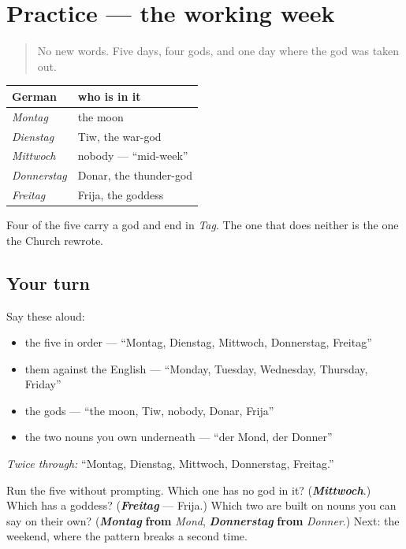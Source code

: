 \section[Practice]{Practice — the working week}

\label{lesson:GE-C07-wochentage-1}



\begin{quote}
No new words. Five days, four gods, and one day where the god was taken out.
\end{quote}

\begin{grammarlens}[title={Grammar Lens: the five, assembled}]
\noindent
\begin{tabularx}{\linewidth}{@{}>{\raggedright\arraybackslash}X>{\raggedright\arraybackslash}X@{}}
\toprule
\textbf{German} & \textbf{who is in it} \\
\midrule
\emph{Montag} & the moon \\
\emph{Dienstag} & Tiw, the war-god \\
\emph{Mittwoch} & nobody — \textquotedblleft{}mid-week\textquotedblright{} \\
\emph{Donnerstag} & Donar, the thunder-god \\
\emph{Freitag} & Frija, the goddess \\
\bottomrule
\end{tabularx}

Four of the five carry a god and end in \emph{Tag}. The one that does neither is the one the Church rewrote.
\end{grammarlens}

\subsection*{Your turn}
Say these aloud:

\begin{itemize}
\raggedright
  \item the five in order — \textquotedblleft{}Montag, Dienstag, Mittwoch, Donnerstag, Freitag\textquotedblright{}
  \item them against the English — \textquotedblleft{}Monday, Tuesday, Wednesday, Thursday, Friday\textquotedblright{}
  \item the gods — \textquotedblleft{}the moon, Tiw, nobody, Donar, Frija\textquotedblright{}
  \item the two nouns you own underneath — \textquotedblleft{}der Mond, der Donner\textquotedblright{}
\end{itemize}

\emph{Twice through:} \textquotedblleft{}Montag, Dienstag, Mittwoch, Donnerstag, Freitag.\textquotedblright{}

\begin{tcolorbox}[breakable,colback=teal!4,colframe=teal!35!black,title={Before you move on}]
Run the five without prompting. Which one has no god in it? (\emph{\textbf{Mittwoch}}.) Which has a goddess? (\emph{\textbf{Freitag}} — Frija.) Which two are built on nouns you can say on their own? (\emph{\textbf{Montag}} \textbf{from} \emph{Mond}, \emph{\textbf{Donnerstag}} \textbf{from} \emph{Donner}.) Next: the weekend, where the pattern breaks a second time.
\end{tcolorbox}

